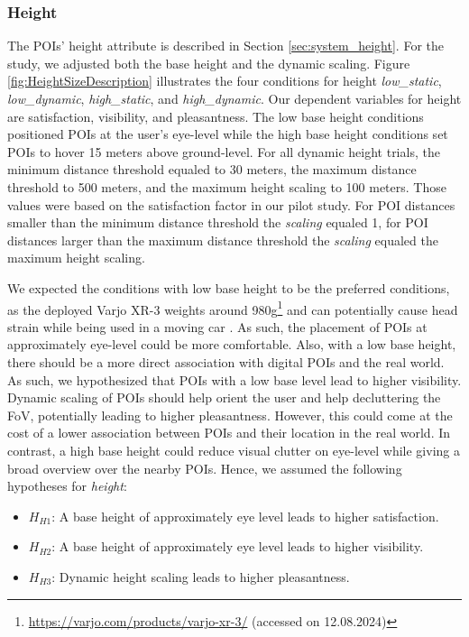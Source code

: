 \subsubsection*{\textbf{Height}}
The POIs' height attribute is described in Section \ref{sec:system_height}. For the study, we adjusted both the base height and the dynamic scaling. Figure \ref{fig:HeightSizeDescription} illustrates the four conditions for height \textit{low\_static}, \textit{low\_dynamic}, \textit{high\_static}, and \textit{high\_dynamic}. Our dependent variables for height are satisfaction, visibility, and pleasantness. The low base height conditions positioned POIs at the user's eye-level while the high base height conditions set POIs to hover 15 meters above ground-level. For all dynamic height trials, the minimum distance threshold equaled to 30 meters, the maximum distance threshold to 500 meters, and the maximum height scaling to 100 meters. Those values were based on the satisfaction factor in our pilot study. For POI distances smaller than the minimum distance threshold the \textit{scaling} equaled 1, for POI distances larger than the maximum distance threshold the \textit{scaling} equaled the maximum height scaling. 

We expected the conditions with low base height to be the preferred conditions, as the deployed Varjo XR-3 weights around 980g\footnote{\label{foot:Varjo}\url{https://varjo.com/products/varjo-xr-3/} (accessed on 12.08.2024)} and can potentially cause head strain while being used in a moving car \cite{Schramm23Assessing}. As such, the placement of POIs at approximately eye-level could be more comfortable. Also, with a low base height, there should be a more direct association with digital POIs and the real world. As such, we hypothesized that POIs with a low base level lead to higher visibility. Dynamic scaling of POIs should help orient the user and help decluttering the FoV, potentially leading to higher pleasantness. However, this could come at the cost of a lower association between POIs and their location in the real world. In contrast, a high base height could reduce visual clutter on eye-level while giving a broad overview over the nearby POIs. Hence, we assumed the following hypotheses for \textit{height}:
\begin{itemize}
    \item $H_{H1}$: A base height of approximately eye level leads to higher satisfaction.
    \item $H_{H2}$: A base height of approximately eye level leads to higher visibility.
    \item $H_{H3}$: Dynamic height scaling leads to higher pleasantness.
\end{itemize}



